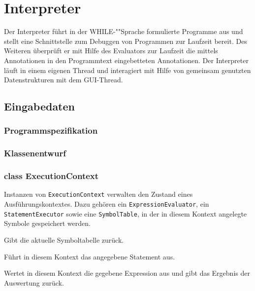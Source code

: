 \section{Interpreter}

Der Interpreter führt in der WHILE-""Sprache formulierte Programme aus und stellt eine Schnittstelle zum Debuggen von Programmen zur Laufzeit bereit. Des Weiteren überprüft er mit Hilfe des Evaluators zur Laufzeit die mittels Annotationen in den Programmtext eingebetteten Annotationen. Der Interpreter läuft in einem eigenen Thread und interagiert mit Hilfe von gemeinsam genutzten Datenstrukturen mit dem GUI-Thread.

\subsection{Eingabedaten}

\subsubsection{Programmspezifikation}


\subsubsection{Klassenentwurf}

\subsubsection{class ExecutionContext}
Instanzen von \texttt{ExecutionContext} verwalten den Zustand eines Ausführungskontextes. Dazu gehören ein \texttt{ExpressionEvaluator}, ein \texttt{StatementExecutor} sowie eine \texttt{SymbolTable}, in der in diesem Kontext angelegte Symbole gespeichert werden.

\begin{description}
\end{description}

\begin{description}
    Gibt die aktuelle Symboltabelle zurück.

    Führt in diesem Kontext das angegebene Statement aus.

    Wertet in diesem Kontext die gegebene Expression aus und gibt das Ergebnis der Auswertung zurück.
\end{description}


